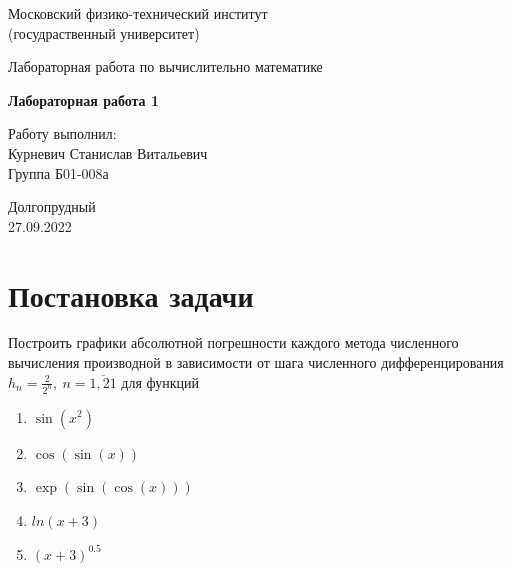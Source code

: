 \documentclass[a4paper,11.5pt]{article} %
\begin{document}
	
	
	\begin{titlepage}
		
		\newpage
		\begin{center}
			\normalsize Московский физико-технический институт \\(госудраственный 			университет)
		\end{center}
		
		\vspace{6em}
		
		\begin{center}
			\Large Лабораторная работа по вычислительно математике\\
		\end{center}
		
		\vspace{1em}
		
		\begin{center}
			\large \textbf{Лабораторная работа 1}
		\end{center}
		
		\vspace{2em}
		
		\begin{center}
			\large Работу выполнил:\\	
			Курневич Станислав Витальевич\\
			Группа Б01-008а
		\end{center}
		
		\vspace{\fill}
		
		\begin{center}
			Долгопрудный \\27.09.2022
		\end{center}
		
	\end{titlepage}
	
	
    \section{Постановка задачи}
    
    Построить графики абсолютной погрешности каждого метода численного вычисления производной в зависимости от шага численного дифференцирования $h_n = \frac{2}{2^n},~ n = \overline{1, 21}$ для функций
    \begin{enumerate}
        \item $\sin(x^2)$
        \item $\cos(\sin(x))$
        \item $\exp(\sin(\cos(x)))$
        \item $ln(x + 3)$
        \item $(x + 3)^{0.5}$
    \end{enumerate}
\end{document}
